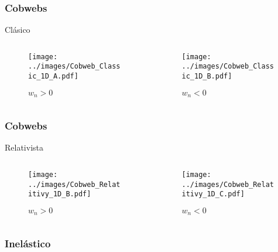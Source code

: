 \documentclass{beamer}
\begin{document}
\begin{frame}
    \frametitle[prueb1]{Cobwebs}{Clásico}
    \centering
    \begin{columns}
        \begin{column}{0.5\textwidth}
            \vspace{0.5cm}
            \begin{figure}
                \centering
                \texttt{[image: ../images/Cobweb\_Classic\_1D\_A.pdf]}
                \caption{$w_n>0$}
            \end{figure}  
        \end{column}
        \begin{column}{0.5\textwidth}
            \begin{figure}
                \centering
                \texttt{[image: ../images/Cobweb\_Classic\_1D\_B.pdf]}
                \caption{$w_n<0$}
            \end{figure}  
        \end{column}
    \end{columns}
\end{frame}

\begin{frame}
    \frametitle[prueb1]{Cobwebs}{Relativista}
    \centering
    \begin{columns}
        \begin{column}{0.5\textwidth}
            \vspace{0.cm}
            \begin{figure}
                \centering
                \texttt{[image: ../images/Cobweb\_Relatitivy\_1D\_B.pdf]}
                \caption{$w_n>0$}
            \end{figure}  
        \end{column}
        \begin{column}{0.5\textwidth}
            \begin{figure}
                \centering
                \texttt{[image: ../images/Cobweb\_Relatitivy\_1D\_C.pdf]}
                \caption{$w_n<0$}
            \end{figure}  
        \end{column}
    \end{columns}
\end{frame}

\begin{frame}
    \frametitle[prueb1]{Inelástico} 
\end{frame}
\end{document}
